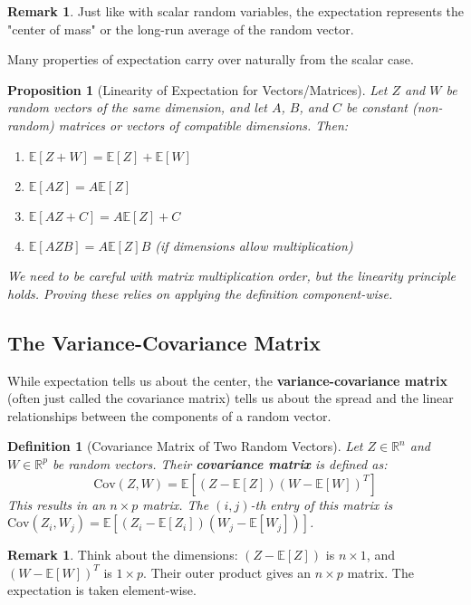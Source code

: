 \documentclass[11pt]{article}
\newtheorem{proposition}[theorem]{Proposition}
\newtheorem{definition}[theorem]{Definition}
\theoremstyle{definition}
\newtheorem{remark}[theorem]{Remark}
\newcommand{\R}{\mathbb{R}} %
\newcommand{\E}{\mathbb{E}} %
\newcommand{\Cov}{\mathrm{Cov}} %
\newcommand{\T}{^T} %
\begin{document}
\begin{remark}
Just like with scalar random variables, the expectation represents the "center of mass" or the long-run average of the random vector.
\end{remark}

Many properties of expectation carry over naturally from the scalar case.

\begin{proposition}[Linearity of Expectation for Vectors/Matrices]
\label{prop:linearity_expectation}
Let $Z$ and $W$ be random vectors of the same dimension, and let $A$, $B$, and $C$ be constant (non-random) matrices or vectors of compatible dimensions. Then:
\begin{enumerate}
    \item $\E[Z + W] = \E[Z] + \E[W]$
    \item $\E[AZ] = A\E[Z]$
    \item $\E[AZ + C] = A\E[Z] + C$
    \item $\E[AZB] = A\E[Z]B$ (if dimensions allow multiplication)
\end{enumerate}
We need to be careful with matrix multiplication order, but the linearity principle holds. Proving these relies on applying the definition component-wise.
\end{proposition}

\subsection{The Variance-Covariance Matrix}
\label{subsec:covariance_matrix}

While expectation tells us about the center, the \textbf{variance-covariance matrix} (often just called the covariance matrix) tells us about the spread and the linear relationships between the components of a random vector.

\begin{definition}[Covariance Matrix of Two Random Vectors]
\label{def:cov_two_vectors}
Let $Z \in \R^n$ and $W \in \R^p$ be random vectors. Their \textbf{covariance matrix} is defined as:
\[
\Cov(Z, W) = \E\left[ (Z - \E[Z]) (W - \E[W])\T \right]
\]
This results in an $n \times p$ matrix. The $(i, j)$-th entry of this matrix is $\Cov(Z_i, W_j) = \E[(Z_i - \E[Z_i])(W_j - \E[W_j])]$.
\end{definition}

\begin{remark}
Think about the dimensions: $(Z - \E[Z])$ is $n \times 1$, and $(W - \E[W])\T$ is $1 \times p$. Their outer product gives an $n \times p$ matrix. The expectation is taken element-wise.
\end{remark}
\end{document}
